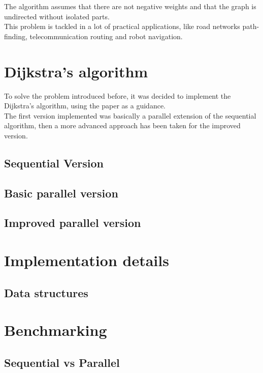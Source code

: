 \documentclass[
	a4paper, %
	12pt, %
]{class}
\begin{document}
The algorithm assumes that there are not negative weights and that the graph is undirected without isolated parts.\\

This problem is tackled in a lot of practical applications, like road networks path-finding, telecommunication routing and robot navigation.

\section{Dijkstra’s algorithm}
To solve the problem introduced before, it was decided to implement the Dijkstra’s algorithm, using the paper \cite{paper}
as a guidance.\\

The first version implemented was basically a parallel extension of the sequential algorithm,
then a more advanced approach has been taken for the improved version.
\subsection{Sequential Version}


\subsection{Basic parallel version}

\subsection{Improved parallel version}

\section{Implementation details}

\subsection{Data structures}

\section{Benchmarking}

\subsection{Sequential vs Parallel}

\printbibliography %

\end{document}
